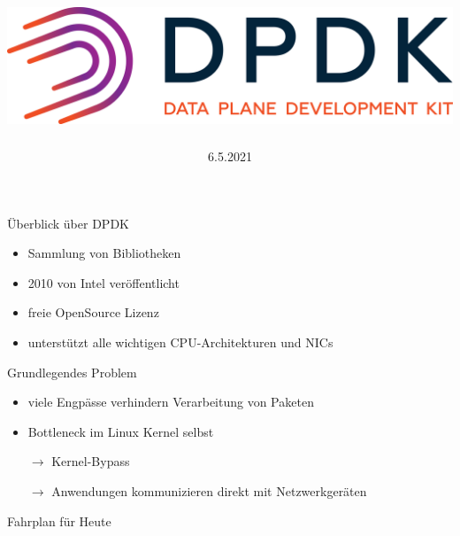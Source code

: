 \documentclass{beamer}
\title{\includegraphics[scale=.45]{img/dpdk_logo.png}}
\date{6.5.2021}
\begin{document}
\begin{frame}
    \maketitle %
\end{frame}

\begin{frame}{Überblick über DPDK}
    \begin{itemize}
        \item Sammlung von Bibliotheken
        \item 2010 von Intel veröffentlicht
        \item freie OpenSource Lizenz
        \item unterstützt alle wichtigen CPU-Architekturen und NICs
    \end{itemize}
\end{frame}

\begin{frame}{Grundlegendes Problem}
    \begin{itemize}
        \item viele Engpässe verhindern Verarbeitung von Paketen
        \item Bottleneck im Linux Kernel selbst
        \item[$\rightarrow$] Kernel-Bypass
        \item[$\rightarrow$] Anwendungen kommunizieren direkt mit Netzwerkgeräten
    \end{itemize}
\end{frame}

\begin{frame}{Fahrplan für Heute}
    \tableofcontents
\end{frame}

\end{document}

